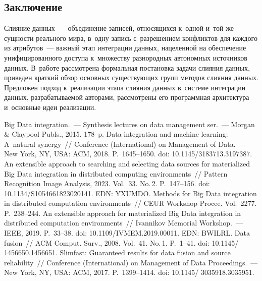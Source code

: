 \begin{multicols}{2}
\vspace*{-6pt}

\section{Заключение}

\vspace*{-3pt}
    
    Слияние данных~--- объединение записей, относящихся к~одной и~той 
же сущности реального мира, в~одну запись с~разрешением конфликтов для 
каждого из атрибутов~--- важ\-ный этап интеграции данных, нацеленной на 
обеспечение унифицированного до\-сту\-па к~множеству разнородных 
автономных источников данных. В~работе рас\-смот\-ре\-на формальная 
по\-ста\-нов\-ка задачи слияния данных, приведен краткий обзор основных 
сущест\-ву\-ющих групп методов слияния данных. Предложен подход 
к~реализации этапа слияния данных в~сис\-те\-ме интеграции данных, 
раз\-ра\-ба\-ты\-ва\-емой авторами, рас\-смот\-ре\-ны его программная архитектура 
и~основ\-ные идеи реализации. 
    
{\small\frenchspacing
 {\baselineskip=10.6pt
 \begin{thebibliography}{9}
 Big Data integration.~--- Synthesis lectures on data  
management ser.~--- Morgan \& Claypool Publs., 2015. 178~p.
 Data integration and machine learning: A~natural synergy~// 
Conference (International) on Management of 
Data.~--- New York, NY, USA: ACM, 2018. P.~1645--1650. doi: 
10.1145/3183713.3197387.
 An extensible approach to searching and selecting data 
sources for materialized Big Data integration in distributed computing environments~// Pattern 
Recognition Image Analysis, 2023. Vol.~33. No.\,2. P.~147--156.  doi: 
10.1134/S1054661823020141. EDN: \mbox{YXUMDO}.
 Methods for Big Data integration in distributed computation 
environments~// CEUR Workshop Procee. Vol.~2277. P.~238--244.
 An extensible approach for materialized Big Data integration in 
distributed computation environments~// Ivannikov Memorial Workshop.~--- 
IEEE, 2019. P.~33--38. doi: 10.1109/IVMEM.2019.00011. EDN: \mbox{BWILRL}.
 Data fusion~// ACM Comput. Surv., 2008. Vol.~41. No.\,1. 
P.~1--41. doi: 10.1145/ 1456650.1456651.
 Slimfast: 
Guaranteed results for data fusion and source reliability~// Conference (International) on Management of Data Proceedings.~--- New York, 
NY, USA: ACM, 2017. P.~1399--1414. doi: 10.1145/ 3035918.3035951.
\end{thebibliography}

 }
 }

\end{multicols}

